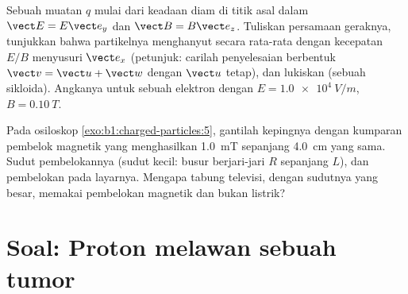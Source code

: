 \begin{exercise}[$\star\star\star$]\label{exo:b1:charged-particles:11}
Sebuah muatan $q$ mulai dari keadaan diam di titik asal dalam $\vect E = E\vect e_y$ dan
$\vect B = B\vect e_z$. Tuliskan persamaan geraknya, tunjukkan bahwa
partikelnya menghanyut secara rata-rata dengan kecepatan $E/B$ menyusuri $\vect e_x$
(petunjuk: carilah penyelesaian berbentuk $\vect v = \vect u + \vect w$ dengan
$\vect u$ tetap), dan lukiskan  (sebuah sikloida). Angkanya untuk
sebuah elektron dengan $E = \qty{1.0e4}{V/m}$, $B = \qty{0.10}{T}$.
\end{exercise}

\begin{exercise}[$\star\star\star$]\label{exo:b1:charged-particles:12}
Pada osiloskop \cref{exo:b1:charged-particles:5}, gantilah kepingnya
dengan kumparan pembelok magnetik yang menghasilkan \qty{1.0}{mT} sepanjang
\qty{4.0}{cm} yang sama. Sudut pembelokannya (sudut kecil: busur berjari-jari $R$
sepanjang $L$), dan pembelokan pada layarnya. Mengapa tabung televisi,
dengan sudutnya yang besar, memakai pembelokan magnetik dan bukan listrik?
\end{exercise}

\section{Soal: Proton melawan sebuah tumor}

